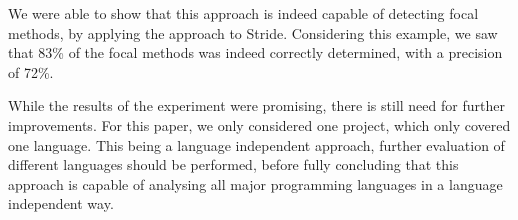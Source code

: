 \documentclass[11pt]{article}
\begin{document}
\begin{multicols}{2}
We were able to show that this approach is indeed capable of detecting focal methods, by applying the approach to Stride. Considering this example, we saw that 83\% of the focal methods was indeed correctly determined, with a precision of 72\%.

While the results of the experiment were promising, there is still need for further improvements. For this paper, we only considered one project, which only covered one language. This being a language independent approach, further evaluation of different languages should be performed, before fully concluding that this approach is capable of analysing all major programming languages in a language independent way.

\printbibliography
\end{multicols}
\end{document}

